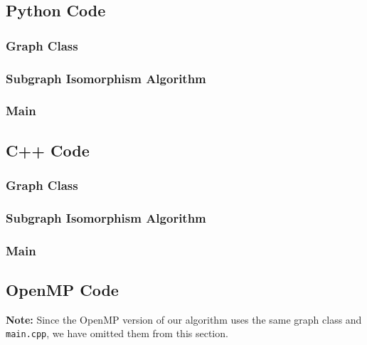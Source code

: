 \documentclass{article}
\begin{document}
  \subsection{Python Code}
    \subsubsection{Graph Class}
      
    \subsubsection{Subgraph Isomorphism Algorithm}
      
    \subsubsection{Main}
      

  \subsection{C++ Code}
    \subsubsection{Graph Class}
      
    \subsubsection{Subgraph Isomorphism Algorithm}
      
    \subsubsection{Main}
      

  \subsection{OpenMP Code}
    \textbf{Note:} Since the OpenMP version of our algorithm uses the same graph class and \texttt{main.cpp}, we have omitted them from this section.
\end{document}
